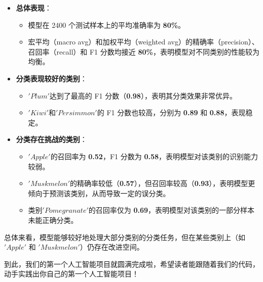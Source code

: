 \begin{itemize}
    \item \textbf{总体表现}：
        \begin{itemize}
            \item 模型在 2400 个测试样本上的平均准确率为 \textbf{80\%}。
            \item 宏平均（macro avg）和加权平均（weighted avg）的精确率（precision）、召回率（recall）和 F1 分数均接近 \textbf{80\%}，表明模型对不同类别的性能较为均衡。
        \end{itemize}

    \item \textbf{分类表现较好的类别}：
        \begin{itemize}
            \item $'Plum'$达到了最高的 F1 分数（\textbf{0.98}），表明其分类效果非常优异。
            \item $'Kiwi'$和$'Persimmon'$的 F1 分数也较高，分别为 \textbf{0.89} 和 \textbf{0.88}，表现稳定。
        \end{itemize}

    \item \textbf{分类存在挑战的类别}：
        \begin{itemize}
            \item $'Apple'$的召回率为 \textbf{0.52}，F1 分数为 \textbf{0.58}，表明模型对该类别的识别能力较弱。
            \item $'Muskmelon'$的精确率较低（\textbf{0.57}），但召回率较高（\textbf{0.93}），表明模型更倾向于预测该类别，从而导致一定的误分类。
            \item 类别$'Pomegranate'$的召回率仅为 \textbf{0.69}，表明模型对该类别的一部分样本未能正确分类。
        \end{itemize}
\end{itemize}
总体来看，模型能够较好地处理大部分类别的分类任务，但在某些类别上（如$'Apple'$ 和 $'Muskmelon'$）仍存在改进空间。

到此，我们的第一个人工智能项目就圆满完成啦，希望读者能跟随着我们的代码，动手实践出你自己的第一个人工智能项目！



